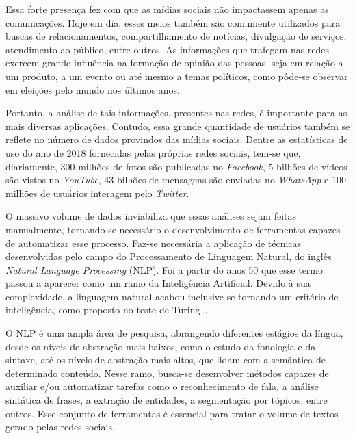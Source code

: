 Essa forte presença fez com que as mídias sociais não impactassem apenas as
comunicações.
Hoje em dia, esses meios também são comumente utilizados para buscas de
relacionamentos, compartilhamento de notícias, divulgação de serviços,
atendimento ao público, entre outros.
As informações que trafegam nas redes exercem grande influência na formação de
opinião das pessoas, seja em relação a um produto, a um evento ou até mesmo
a temas políticos, como pôde-se observar em eleições pelo mundo nos últimos anos.

Portanto, a análise de tais informações, presentes nas redes, é importante para
as mais diversas aplicações.
Contudo, essa grande quantidade de usuários também se reflete no número de dados
provindos das mídias sociais.
Dentre as estatísticas de uso do ano de 2018 fornecidas pelas próprias redes
sociais, tem-se que, diariamente, 300 milhões de fotos são publicadas no
\textit{Facebook}, 5 bilhões de vídeos são vistos no \textit{YouTube}, 43
bilhões de mensagens são enviadas no \textit{WhatsApp} e 100 milhões de usuários
interagem pelo \textit{Twitter}.

O massivo volume de dados inviabiliza que essas análises sejam feitas
manualmente, tornando-se necessário o desenvolvimento de ferramentas capazes de
automatizar esse processo.
Faz-se necessária a aplicação de técnicas desenvolvidas pelo campo do
Processamento de Linguagem Natural, do inglês \textit{Natural Language Processing}
(NLP).
Foi a partir do anos 50 que esse termo passou a aparecer como um ramo da
Inteligência Artificial.
Devido à sua complexidade, a linguagem natural acabou inclusive se tornando um
critério de inteligência, como proposto no teste de Turing~\cite{turing50}.

O NLP é uma ampla área de pesquisa, abrangendo diferentes estágios da língua,
desde os níveis de abstração mais baixos, como o estudo da fonologia e da
sintaxe, até os níveis de abstração mais altos, que lidam com a semântica de
determinado conteúdo.
Nesse ramo, busca-se desenvolver métodos capazes de auxiliar e/ou automatizar
tarefas como o reconhecimento de fala, a análise sintática de frases, a
extração de entidades, a segmentação por tópicos, entre outros.
Esse conjunto de ferramentas é essencial para tratar o volume de textos
gerado pelas redes sociais.

